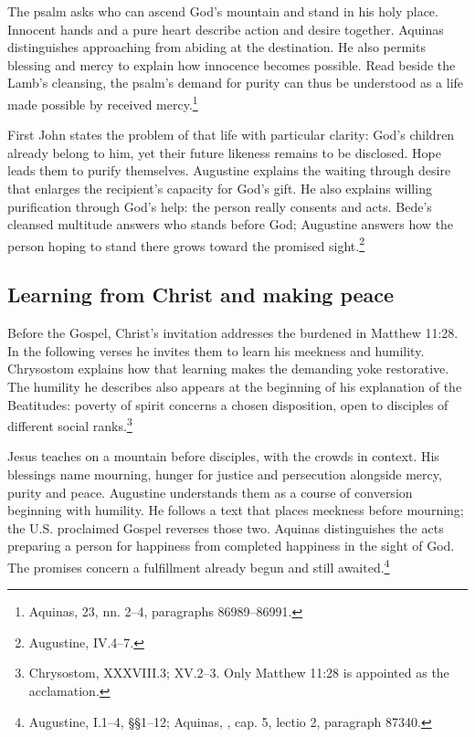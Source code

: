 The psalm asks who can ascend God's mountain and stand in his holy place. Innocent hands and a pure heart describe action and desire together. Aquinas distinguishes approaching from abiding at the destination. He also permits blessing and mercy to explain how innocence becomes possible. Read beside the Lamb's cleansing, the psalm's demand for purity can thus be understood as a life made possible by received mercy.\footnote{Aquinas,  23, nn. 2--4, paragraphs 86989--86991.}

First John states the problem of that life with particular clarity: God's children already belong to him, yet their future likeness remains to be disclosed. Hope leads them to purify themselves. Augustine explains the waiting through desire that enlarges the recipient's capacity for God's gift. He also explains willing purification through God's help: the person really consents and acts. Bede's cleansed multitude answers who stands before God; Augustine answers how the person hoping to stand there grows toward the promised sight.\footnote{Augustine,  IV.4--7.}

\newpage
\subsection{Learning from Christ and making peace}
Before the Gospel, Christ's invitation addresses the burdened in Matthew 11:28. In the following verses he invites them to learn his meekness and humility. Chrysostom explains how that learning makes the demanding yoke restorative. The humility he describes also appears at the beginning of his explanation of the Beatitudes: poverty of spirit concerns a chosen disposition, open to disciples of different social ranks.\footnote{Chrysostom,  XXXVIII.3; XV.2--3. Only Matthew 11:28 is appointed as the acclamation.}

Jesus teaches on a mountain before disciples, with the crowds in context. His blessings name mourning, hunger for justice and persecution alongside mercy, purity and peace. Augustine understands them as a course of conversion beginning with humility. He follows a text that places meekness before mourning; the U.S. proclaimed Gospel reverses those two. Aquinas distinguishes the acts preparing a person for happiness from completed happiness in the sight of God. The promises concern a fulfillment already begun and still awaited.\footnote{Augustine,  I.1--4, §§1--12; Aquinas, , cap. 5, lectio 2, paragraph 87340.}

